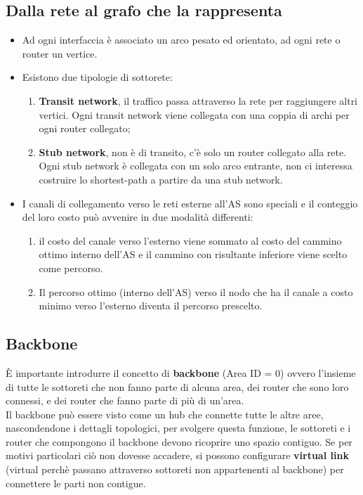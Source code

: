 \documentclass{article}
\begin{document}
\subsection{Dalla rete al grafo che la rappresenta}
\begin{itemize}
    \item Ad ogni interfaccia è associato un arco pesato ed orientato, ad ogni rete o router un vertice.
    \item Esistono due tipologie di sottorete:
    \begin{enumerate}
        \item \textbf{Transit network}, il traffico passa attraverso la rete per raggiungere altri vertici. Ogni transit network viene collegata con una coppia di archi per ogni router collegato;
        \item \textbf{Stub network}, non è di transito, c'è solo un router collegato alla rete. Ogni stub network è collegata con un solo arco entrante, non ci interessa costruire lo shortest-path a partire da una stub network.
    \end{enumerate}
    \item I canali di collegamento verso le reti esterne all'AS sono speciali e il conteggio del loro costo può avvenire in due modalità differenti:
    \begin{enumerate}
        \item il costo del canale verso l'esterno viene sommato al costo del cammino ottimo interno dell'AS e il cammino con risultante inferiore viene scelto come percorso.
        \item Il percorso ottimo (interno dell’AS) verso il nodo che ha il canale a costo minimo verso l’esterno diventa il percorso prescelto.
    \end{enumerate}
\end{itemize}
\subsection{Backbone}
È importante introdurre il concetto di \textbf{backbone} (Area ID = 0) ovvero l'insieme di tutte le sottoreti che non fanno parte di alcuna area, dei router che sono loro connessi, e dei router che fanno parte di più di un’area.\\
Il backbone può essere visto come un hub che connette tutte le altre aree, nascondendone i dettagli topologici, per svolgere questa funzione, le sottoreti e i router che compongono il backbone devono ricoprire uno spazio contiguo. Se per motivi particolari ciò non dovesse accadere, si possono configurare \textbf{virtual link} (virtual perchè passano attraverso sottoreti non appartenenti al backbone) per connettere le parti non contigue.
\end{document}
